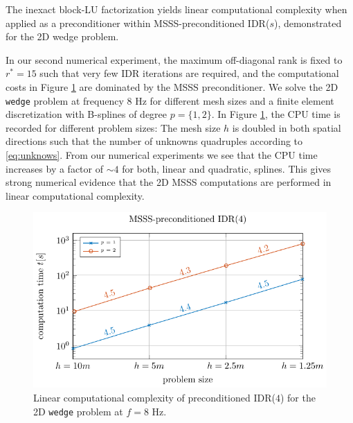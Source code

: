 \begin{exper} \label{exp:lin_compl}
The inexact block-LU factorization yields linear computational complexity when applied as a preconditioner within MSSS-pre\-conditioned IDR($s$), demonstrated for the 2D wedge problem.
\end{exper}
In our second numerical experiment, the maximum off-di\-ag\-o\-nal rank is fixed to $r^\ast =15$ such that very few IDR iterations are required, and the computational costs in Figure \ref{fig:exp:linCompl} are dominated by the MSSS preconditioner. We solve the 2D \texttt{wedge} problem at frequency $8$ Hz for different mesh sizes and a finite element discretization with B-splines of degree $p = \{1,2\}$. In Figure \ref{fig:exp:linCompl}, the CPU time is recorded for different problem sizes: The mesh size $h$ is doubled in both spatial directions such that the number of unknowns quadruples according to \eqref{eq:unknows}. From our numerical experiments we see that the CPU time increases by a factor of $\sim 4$ for both, linear and quadratic, splines. This gives strong numerical evidence that the 2D MSSS computations are performed in linear computational complexity.

\begin{figure}[ht]
  \includegraphics[width=\columnwidth]{draw_fig_new2.pdf}
\caption{Linear computational complexity of preconditioned IDR($4$) for the 2D \texttt{wedge} problem at $f=8$ Hz.}
\label{fig:exp:linCompl}
\end{figure}

